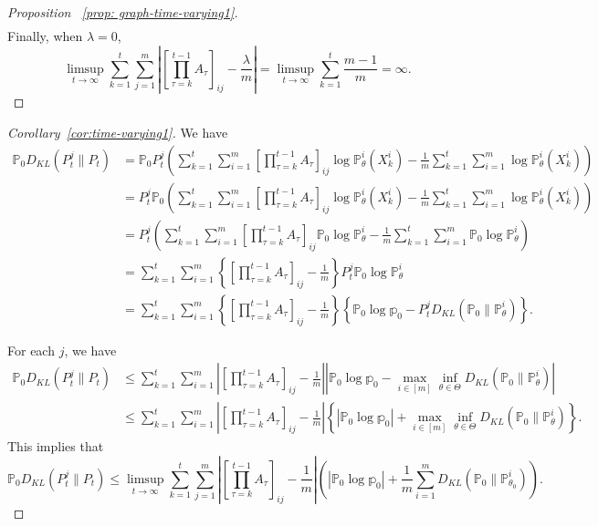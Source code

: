 \documentclass[twoside,11pt]{article}
\numberwithin{equation}{section}
\newcommand\bP{\mathbb{P}}
\newcommand\bp{\mathbb{p}}
\begin{document}
{\begin{proof} [Proposition ~\ref{prop: graph-time-varying1}]
\begin{align*}
\end{align*}
Finally, when $\lambda = 0$, 
\begin{equation*}
     \limsup_{t \to \infty} \sum_{k = 1}^t \sum_{j = 1}^m \left|\left[\prod_{\tau = k}^{t-1}A_\tau \right]_{ij}- \frac{\lambda}{m} \right|  
       =  \limsup_{t \to \infty} \sum_{k = 1}^t  \frac{m-1}{m} = \infty. 
\end{equation*}
\end{proof}
\begin{proof}[Corollary~\ref{cor:time-varying1}]
We have
    \begin{align*}
\bP_0 D_{KL}(P_t^j \parallel P_t) &=  \bP_0 P_t^j \left( \sum_{k = 1}^t \sum_{i = 1}^m \left[\prod_{\tau = k}^{t-1}A_\tau \right]_{ij} \log \bP_\theta^i (X_k^i) -  \frac{1}{m}\sum_{k = 1}^t \sum_{i = 1}^m  \log \bP_\theta^i (X_k^i) \right) \\
     &=P_t^j \bP_0 \left( \sum_{k = 1}^t \sum_{i = 1}^m \left[\prod_{\tau = k}^{t-1}A_\tau \right]_{ij} \log \bP_\theta^i (X_k^i) -  \frac{1}{m}\sum_{k = 1}^t \sum_{i = 1}^m  \log \bP_\theta^i (X_k^i) \right) \\
     &= P_t^j  \left( \sum_{k = 1}^t \sum_{i = 1}^m \left[\prod_{\tau = k}^{t-1}A_\tau \right]_{ij} \bP_0 \log \bP_\theta^i -  \frac{1}{m}\sum_{k = 1}^t \sum_{i = 1}^m  \bP_0 \log \bP_\theta^i \right) \\
     &= \sum_{k = 1}^t \sum_{i = 1}^m 
 \left\{  \left[\prod_{\tau = k}^{t-1}A_\tau \right]_{ij} -  \frac{1}{m} \right\} P_t^j  \bP_0 \log \bP_\theta^i \\
 &= \sum_{k = 1}^t \sum_{i = 1}^m 
 \left\{  \left[\prod_{\tau = k}^{t-1}A_\tau \right]_{ij} -  \frac{1}{m} \right\} \left\{\bP_0\log \bp_0  - P_t^j D_{KL}(\bP_0 \parallel \bP_\theta^i)\right\}.
 \end{align*}


For each $j$, we have
\begin{align*}
\bP_0 D_{KL}(P_t^j \parallel P_t) &\leq  \sum_{k = 1}^t \sum_{i = 1}^m | \left[\prod_{\tau = k}^{t-1}A_\tau \right]_{ij} -  \frac{1}{m}| \left|\bP_0\log \bp_0 - \max_{i \in [m]}\inf_{\theta \in \Theta} D_{KL}(\bP_0 \parallel \bP_\theta^i) \right| \\
 & \leq  \sum_{k = 1}^t \sum_{i = 1}^m | \left[\prod_{\tau = k}^{t-1}A_\tau \right]_{ij} -  \frac{1}{m}| \left\{|\bP_0\log \bp_0| + \max_{i \in [m]}\inf_{\theta \in \Theta} D_{KL}(\bP_0 \parallel \bP_\theta^i) \right\}. 
\end{align*}
This implies that 
\begin{equation*}
\bP_0 D_{KL}(P_t^j \parallel P_t)  \leq    \limsup_{t \to \infty} \sum_{k = 1}^t \sum_{j = 1}^m \left|\left[\prod_{\tau = k}^{t-1}A_\tau \right]_{ij}- \frac{1}{m} \right| \left(|\bP_0\log \bp_0| + \frac{1}{m}\sum_{i = 1}^m D_{KL}(\bP_0 \parallel \bP_{\theta_0}^i)\right). 
\end{equation*}


\end{proof}}
\end{document}
